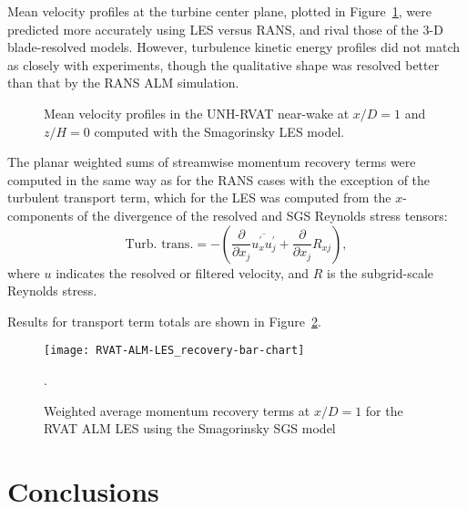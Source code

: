 Mean velocity profiles at the turbine center plane, plotted in
Figure~\ref{fig:RVAT-ALM-LES-profiles}, were predicted more accurately using LES
versus RANS, and rival those of the 3-D blade-resolved models. However,
turbulence kinetic energy profiles did not match as closely with experiments,
though the qualitative shape was resolved better than that by the RANS ALM
simulation.


\begin{figure}
    \centering
    
    \caption{Mean velocity profiles in the UNH-RVAT near-wake at $x/D=1$ and
        $z/H=0$ computed with the Smagorinsky LES model.}
    
    \label{fig:RVAT-ALM-LES-profiles}
\end{figure}

The planar weighted sums of streamwise momentum recovery terms were computed in
the same way as for the RANS cases with the exception of the turbulent transport
term, which for the LES was computed from the $x$-components of the divergence
of the resolved and SGS Reynolds stress tensors:
\begin{equation}
    \text{Turb. trans.} = - \left( \frac{\partial}{\partial x_j}
    \overline{u^\prime_x u^\prime_j} 
    + \frac{\partial}{\partial x_j} R_{xj}
    \right),
\end{equation}
where $u$ indicates the resolved or filtered velocity, and $R$ is the
subgrid-scale Reynolds stress.

Results for transport term totals are shown in
Figure~\ref{fig:RVAT-ALM-LES-recovery}.


\begin{figure}
    \centering
    
    \texttt{[image: RVAT-ALM-LES\_recovery-bar-chart]}
    
    \caption{Weighted average momentum recovery terms at $x/D=1$ for the RVAT
        ALM LES using the Smagorinsky SGS model}.
    
    \label{fig:RVAT-ALM-LES-recovery}
\end{figure}


\section{Conclusions}

